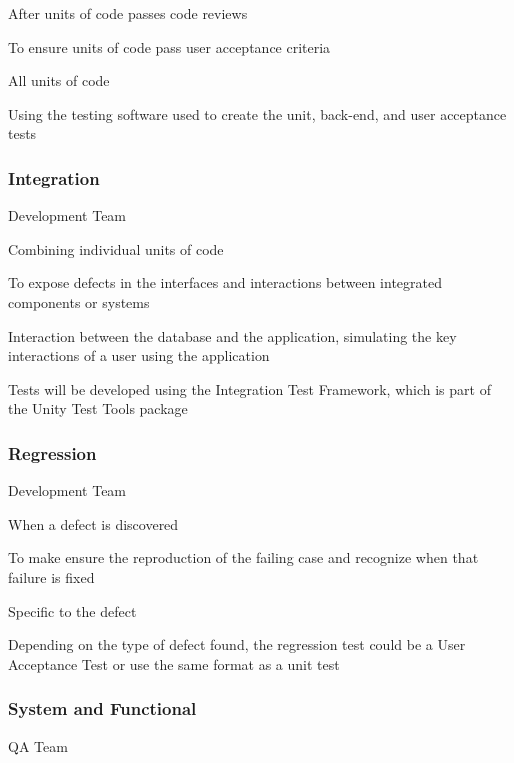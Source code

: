 \documentclass[letterpaper,10pt,english,openany,oneside]{sphinxmanual}
\begin{document}
 After units of code passes code reviews

 To ensure units of code pass user acceptance criteria

 All units of code

 Using the testing software used to create the unit, back-end, and user acceptance tests


\subsubsection{Integration}
\label{\detokenize{test_plan/strategy:integration}}
 Development Team

 Combining individual units of code

 To expose defects in the interfaces and interactions between integrated components or systems

 Interaction between the database and the application, simulating the key interactions of a user using the application

 Tests will be developed using the Integration Test Framework, which is part of the Unity Test Tools package


\subsubsection{Regression}
\label{\detokenize{test_plan/strategy:regression}}
 Development Team

 When a defect is discovered

 To make ensure the reproduction of the failing case and recognize when that failure is fixed

 Specific to the defect

 Depending on the type of defect found, the regression test could be a User Acceptance Test or use the same format as a unit test


\subsubsection{System and Functional}
\label{\detokenize{test_plan/strategy:system-and-functional}}
 QA Team
\end{document}
